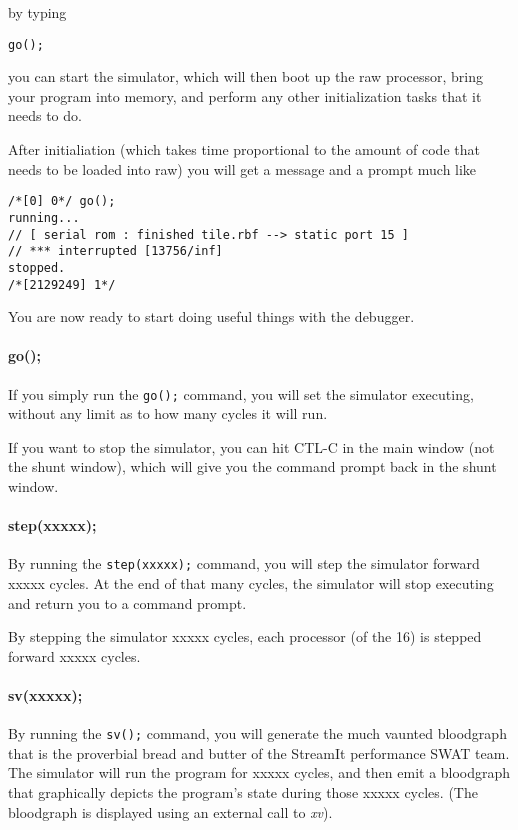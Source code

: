 by typing 

\begin{verbatim}go();\end{verbatim}

you can start the simulator, which will then boot up the raw processor,  
bring your program into memory, and perform any other initialization tasks 
that it needs to do.

After initialiation (which takes time proportional to the amount of code
that needs to be loaded into raw) you will get a message and a prompt much like

\begin{verbatim}
/*[0] 0*/ go();
running...
// [ serial rom : finished tile.rbf --> static port 15 ]
// *** interrupted [13756/inf]
stopped.
/*[2129249] 1*/ 
\end{verbatim}

You are now ready to start doing useful things with the debugger.

\paragraph{go();}
If you simply run the \texttt{go();} command, you will set the simulator executing, 
without any limit as to how many cycles it will run.

If you want to stop the simulator, you can hit CTL-C in the main window (not the
shunt window), which will give you the command prompt back in the shunt window.

\paragraph{step(xxxxx);}
By running the \texttt{step(xxxxx);} command, you will step the simulator 
forward xxxxx cycles. At the end of that many cycles, the simulator 
will stop executing and return you to a command prompt.

By stepping the simulator xxxxx cycles, each processor (of the 16) is stepped
forward xxxxx cycles.

\paragraph{sv(xxxxx);}
By running the \texttt{sv();} command, you will generate the much vaunted
bloodgraph that is the proverbial bread and butter of the StreamIt performance
SWAT team. The simulator will run the program for xxxxx cycles, and then
emit a bloodgraph that graphically depicts the program's state during those
xxxxx cycles. (The bloodgraph is displayed using an external call to \textit{xv}).

